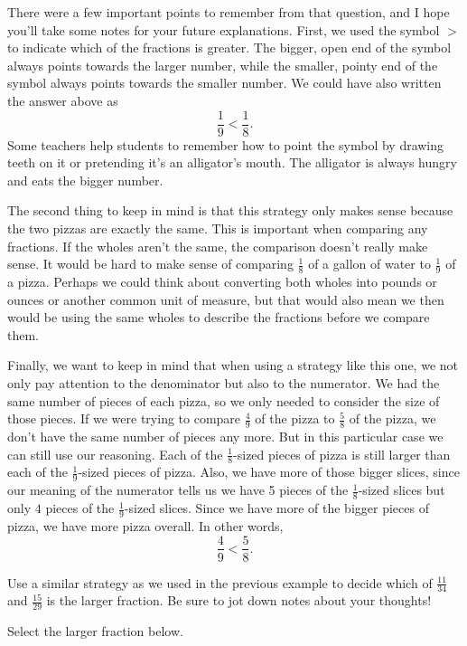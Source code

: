 \documentclass{ximera}
\begin{document}
There were a few important points to remember from that question, and I hope you'll take some notes for your future explanations. First, we used the symbol $>$ to indicate which of the fractions is greater. The bigger, open end of the symbol always points towards the larger number, while the smaller, pointy end of the symbol always points towards the smaller number. We could have also written the answer above as
\[
\frac{1}{9} < \frac{1}{8}.
\]
Some teachers help students to remember how to point the symbol by drawing teeth on it or pretending it's an alligator's mouth. The alligator is always hungry and eats the bigger number.

The second thing to keep in mind is that this strategy only makes sense because the two pizzas are exactly the same. This is important when comparing any fractions. If the wholes aren't the same, the comparison doesn't really make sense. It would be hard to make sense of comparing $\frac{1}{8}$ of a gallon of water to $\frac{1}{9}$ of a pizza. Perhaps we could think about converting both wholes into pounds or ounces or another common unit of measure, but that would also mean we then would be using the same wholes to describe the fractions before we compare them.

Finally, we want to keep in mind that when using a strategy like this one, we not only pay attention to the denominator but also to the numerator. We had the same number of pieces of each pizza, so we only needed to consider the size of those pieces. If we were trying to compare $\frac{4}{9}$ of the pizza to $\frac{5}{8}$ of the pizza, we don't have the same number of pieces any more. But in this particular case we can still use our reasoning. Each of the $\frac{1}{8}$-sized pieces of pizza is still larger than each of the $\frac{1}{9}$-sized pieces of pizza. Also, we have more of those bigger slices, since our meaning of the numerator tells us we have 5 pieces of the $\frac{1}{8}$-sized slices  but only $4$ pieces of the $\frac{1}{9}$-sized slices. Since we have more of the bigger pieces of pizza, we have more pizza overall. In other words, 
\[
\frac{4}{9} < \frac{5}{8}.
\]

\begin{question}
Use a similar strategy as we used in the previous example to decide which of $\frac{11}{34}$ and $\frac{15}{29}$ is the larger fraction. Be sure to jot down notes about your thoughts!

Select the larger fraction below.
\begin{multipleChoice}
\end{multipleChoice}
\end{question}
\end{document}
